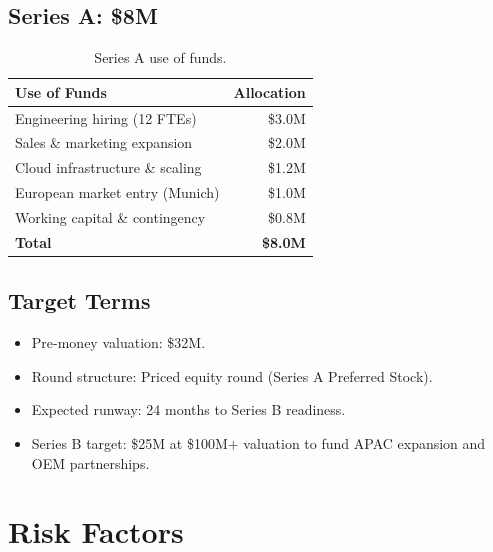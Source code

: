 \documentclass[
    language=english,
    doctype=business-plan,
    institution=none,
]{../../omnilatex}
\begin{document}
\subsection{Series A: \$8M}

\begin{table}[h]
    \centering
    \begin{tabular}{lr}
        \toprule
        \textbf{Use of Funds} & \textbf{Allocation} \\
        \midrule
        Engineering hiring (12 FTEs)       & \$3.0M \\
        Sales \& marketing expansion       & \$2.0M \\
        Cloud infrastructure \& scaling    & \$1.2M \\
        European market entry (Munich)     & \$1.0M \\
        Working capital \& contingency     & \$0.8M \\
        \midrule
        \textbf{Total}                     & \textbf{\$8.0M} \\
        \bottomrule
    \end{tabular}
    \caption{Series A use of funds.}
\end{table}

\subsection{Target Terms}

\begin{itemize}
    \item Pre-money valuation: \$32M.
    \item Round structure: Priced equity round (Series A Preferred Stock).
    \item Expected runway: 24 months to Series B readiness.
    \item Series B target: \$25M at \$100M+ valuation to fund APAC
          expansion and OEM partnerships.
\end{itemize}

\section{Risk Factors}
\end{document}
